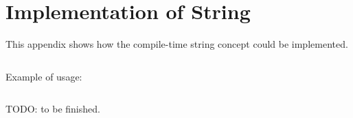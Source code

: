 

\begin{verbatim}
\end{verbatim}

\section{Implementation of String}

This appendix shows how the compile-time string concept could be implemented.

\begin{verbatim}

\end{verbatim}

Example of usage:

\begin{verbatim}
\end{verbatim}


TODO: to be finished.

